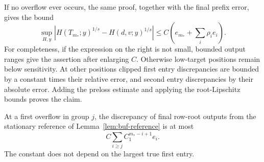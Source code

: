If no overflow ever occurs, the same proof, together with the final prefix
error, gives the bound
\begin{equation}
 \sup_{H,y}|H(T_{m_*};y)^{1/s}-H(d,v;y)^{1/s}|
       \leq C\left(e_{m_*}+\sum_i\rho_i e_i\right).
 \label{eq:buf-no-overflow}
\end{equation}
For completeness, if the expression on the right is not small, bounded
output ranges give the assertion after enlarging $C$.  Otherwise low-target
positions remain below sensitivity.  At other positions clipped first
entry discrepancies are bounded by a constant times their relative error,
and second entry discrepancies by their absolute error.  Adding the
preloss estimate and applying the root-Lipschitz bounds proves the claim.

\begin{lemma}
\label{lem:buf-relative-stability}
At a first overflow in group $j$, the discrepancy of final row-root outputs
from the stationary reference of Lemma~\ref{lem:buf-reference} is at most
\begin{equation}
 C\sum_{i\geq j} C_1^{m_*-i+1}e_i.
 \label{eq:buf-relative-propagation}
\end{equation}
The constant does not depend on the largest true first entry.
\end{lemma}
